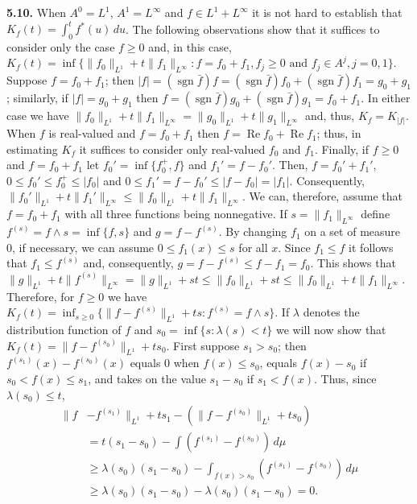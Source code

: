 \textbf{5.10.} When $A^{0} = L^{1}$, $A^{1} = L^{\infty}$ and
$f \in L^{1} + L^{\infty}$ it is not hard to establish that
$K_{f}(t) = \int_{0}^{t}f^{*}(u)\,du$. The following observations show that it
suffices to consider only the case $f \geq 0$ and, in this case,
$K_{f}(t) = \inf\{\|f_{0}\|_{L^{1}} + t\|f_{1}\|_{L^{\infty}} : f = f_{0} + f_{1}, f_{j} \geq 0 \text{ and } f_{j} \in A^{j}, j = 0, 1\}$.
Suppose $f = f_{0} + f_{1}$; then
$|f| = (\operatorname{sgn}\bar{f})f = (\operatorname{sgn}\bar{f})f_{0} + (\operatorname{sgn}\bar{f})f_{1} = g_{0} + g_{1}$;
similarly, if $|f| = g_{0} + g_{1}$ then
$f = (\operatorname{sgn}\bar{f})g_{0} + (\operatorname{sgn}\bar{f})g_{1} = f_{0} + f_{1}$.
In either case we have
$\|f_{0}\|_{L^{1}} + t\|f_{1}\|_{L^{\infty}} = \|g_{0}\|_{L^{1}} + t\|g_{1}\|_{L^{\infty}}$
and, thus, $K_{f} = K_{|f|}$. When $f$ is real-valued and $f = f_{0} + f_{1}$
then $f = \operatorname{Re}f_{0} + \operatorname{Re}f_{1}$; thus, in estimating
$K_{f}$ it suffices to consider only real-valued $f_{0}$ and $f_{1}$. Finally,
if $f \geq 0$ and $f = f_{0} + f_{1}$ let $f_{0}' = \inf\{f_{0}^{+}, f\}$ and
$f_{1}' = f - f_{0}'$. Then, $f = f_{0}' + f_{1}'$,
$0 \leq f_{0}' \leq f_{0}^{+} \leq |f_{0}|$ and
$0 \leq f_{1}' = f - f_{0}' \leq |f - f_{0}| = |f_{1}|$. Consequently,
$\|f_{0}'\|_{L^{1}} + t\|f_{1}'\|_{L^{\infty}} \leq \|f_{0}\|_{L^{1}} + t\|f_{1}\|_{L^{\infty}}$.
We can, therefore, assume that $f = f_{0} + f_{1}$ with all three functions
being nonnegative. If $s = \|f_{1}\|_{L^{\infty}}$ define
$f^{(s)} = f \wedge s = \inf\{f, s\}$ and $g = f - f^{(s)}$. By changing $f_{1}$
on a set of measure 0, if necessary, we can assume $0 \leq f_{1}(x) \leq s$ for
all $x$. Since $f_{1} \leq f$ it follows that $f_{1} \leq f^{(s)}$ and,
consequently, $g = f - f^{(s)} \leq f - f_{1} = f_{0}$. This shows that
$\|g\|_{L^{1}} + t\|f^{(s)}\|_{L^{\infty}} = \|g\|_{L^{1}} + st \leq \|f_{0}\|_{L^{1}} + st \leq \|f_{0}\|_{L^{1}} + t\|f_{1}\|_{L^{\infty}}$.
Therefore, for $f \geq 0$ we have
$K_{f}(t) = \inf_{s \geq 0}\{\|f - f^{(s)}\|_{L^{1}} + ts : f^{(s)} = f \wedge s\}$.
If $\lambda$ denotes the distribution function of $f$ and
$s_{0} = \inf\{s : \lambda(s) < t\}$ we will now show that
$K_{f}(t) = \|f - f^{(s_{0})}\|_{L^{1}} + ts_{0}$. First suppose $s_{1} > s_{0}$;
then $f^{(s_{1})}(x) - f^{(s_{0})}(x)$ equals 0 when $f(x) \leq s_{0}$, equals
$f(x) - s_{0}$ if $s_{0} < f(x) \leq s_{1}$, and takes on the value $s_{1} - s_{0}$
if $s_{1} < f(x)$. Thus, since $\lambda(s_{0}) \leq t$,
\begin{align*}
\|f&-f^{(s_{1})}\|_{L^{1}}+ts_{1}-(\|f-f^{(s_{0})}\|_{L^{1}}+ts_{0})\\
&=t(s_{1}-s_{0})-\int(f^{(s_{1})}-f^{(s_{0})})\,d\mu\\
&\geq\lambda(s_{0})(s_{1}-s_{0})-\int_{f(x)>s_{0}}(f^{(s_{1})}-f^{(s_{0})})\,d\mu\\
&\geq\lambda(s_{0})(s_{1}-s_{0})-\lambda(s_{0})(s_{1}-s_{0})=0.
\end{align*}
